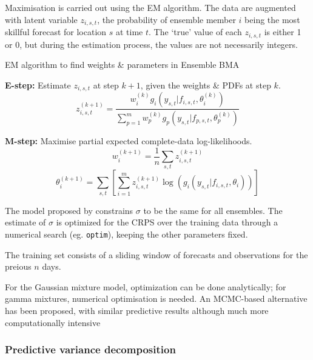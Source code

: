 \documentclass[10pt,fleqn]{article}
\begin{document}
Maximisation is carried out using the EM algorithm. The data are augmented with latent variable $z_{i,s , t}$, the probability of ensemble member $i$ being the most skillful forecast for location $s$ at time $t$. The `true' value of each $z_{i,s,t}$ is either 1 or 0, but during the estimation process, the values are not necessarily integers.

\begin{algorithm}%
    \caption{EM algorithm to find weights \& parameters in Ensemble BMA}
    \label{alg:EM-BMA}
\vspace{5pt}

\textbf{E-step:} Estimate $z_{i,s,t}$ at step $k+1$, given the weights \& PDFs at step $k$.
%
\vspace{5pt}
\[ z_{i,s,t}^{(k+1)} = \frac{w_i^{(k)} g_i(y_{s,t} | f_{i,s,t}, \theta_i^{(k)})}%
	{\sum\limits_{p=1}^m w_p^{(k)} g_p(y_{s,t}|f_{p,s,t}, \theta_p^{(k)})}\]
%
\vspace{5pt}

\textbf{M-step:} Maximise partial expected complete-data log-likelihoods.
%
\[ w_i^{(k+1)} = \frac{1}{n}\sum_{s,t} z_{i,s,t}^{(k+1)} \]
%
\[ \theta_i^{(k+1)} = \sum_{s, t} \left[ \sum_{i=1}^m z_{i,s,t}^{(k+1)} \log \left( g_i(y_{s,t} | f_{i,s,t}, \theta_i) \right)\right]\]
%
\vspace{5pt}
\end{algorithm}

The model proposed by \cite{Raftery2005} constrains $\sigma$ to be the same for all ensembles. The estimate of $\sigma$ is optimized for the CRPS over the training data through a numerical search (eg. \texttt{optim}), keeping the other parameters fixed.

The training set consists of a sliding window of forecasts and observations for the preious $n$ days.





For the Gaussian mixture model, optimization can be done analytically; for gamma mixtures, numerical optimisation is needed. An MCMC-based alternative has been proposed, with similar predictive results although much more computationally intensive \cite{Vrugt2008}







\subsubsection{Predictive variance decomposition}
\end{document}
